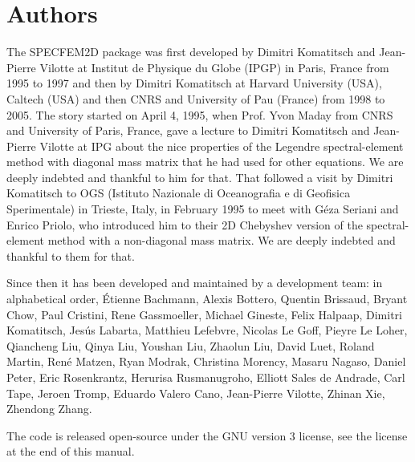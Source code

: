 \section*{Authors}

The SPECFEM2D package was first developed by Dimitri
Komatitsch and Jean-Pierre Vilotte at Institut de Physique du Globe
(IPGP) in Paris, France from 1995 to 1997 and then by Dimitri Komatitsch
at Harvard University (USA), Caltech (USA) and then CNRS and University of Pau (France) from 1998 to 2005.
The story started on April 4, 1995, when Prof. Yvon Maday from CNRS and University of Paris, France, gave a lecture to
Dimitri Komatitsch and Jean-Pierre Vilotte at IPG about the nice properties of the Legendre spectral-element method with diagonal mass matrix that he had used for
other equations. We are deeply indebted and thankful to him for that.
That followed a visit by Dimitri Komatitsch to OGS (Istituto Nazionale di Oceanografia e di Geofisica Sperimentale) in Trieste, Italy, in February 1995
to meet with G\'eza Seriani and Enrico Priolo, who introduced him to their 2D Chebyshev version of the spectral-element method with a non-diagonal mass matrix.
We are deeply indebted and thankful to them for that.\newline

Since then it has been developed and maintained by a development team: in alphabetical order,
\'Etienne Bachmann,
Alexis Bottero,
Quentin Brissaud,
Bryant Chow,
Paul Cristini,
Rene Gassmoeller,
Michael Gineste,
Felix Halpaap,
Dimitri Komatitsch,
Jes\'us Labarta,
Matthieu Lefebvre,
Nicolas Le Goff,
Pieyre Le Loher,
Qiancheng Liu,
Qinya Liu,
Youshan Liu,
Zhaolun Liu,
David Luet,
Roland Martin,
Ren\'e Matzen,
Ryan Modrak,
Christina Morency,
Masaru Nagaso,
Daniel Peter,
Eric Rosenkrantz,
Herurisa Rusmanugroho,
Elliott Sales de Andrade,
Carl Tape,
Jeroen Tromp,
Eduardo Valero Cano,
Jean-Pierre Vilotte,
Zhinan Xie,
Zhendong Zhang.\newline

The code is released open-source under the GNU version 3 license, see the license at the end of this manual.

